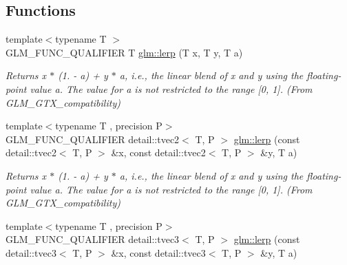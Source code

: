 \subsection*{Functions}
\begin{DoxyCompactItemize}
\item 
{\footnotesize template$<$typename T $>$ }\\G\+L\+M\+\_\+\+F\+U\+N\+C\+\_\+\+Q\+U\+A\+L\+I\+F\+I\+ER T \hyperlink{group__gtx__compatibility_ga5494ba3a95ea6594c86fc75236886864}{glm\+::lerp} (T x, T y, T a)\hypertarget{group__gtx__compatibility_ga5494ba3a95ea6594c86fc75236886864}{}\label{group__gtx__compatibility_ga5494ba3a95ea6594c86fc75236886864}

\begin{DoxyCompactList}\small\item\em Returns x $\ast$ (1. -\/ a) + y $\ast$ a, i.\+e., the linear blend of x and y using the floating-\/point value a. The value for a is not restricted to the range \mbox{[}0, 1\mbox{]}. (From G\+L\+M\+\_\+\+G\+T\+X\+\_\+compatibility) \end{DoxyCompactList}\item 
{\footnotesize template$<$typename T , precision P$>$ }\\G\+L\+M\+\_\+\+F\+U\+N\+C\+\_\+\+Q\+U\+A\+L\+I\+F\+I\+ER detail\+::tvec2$<$ T, P $>$ \hyperlink{group__gtx__compatibility_gad97d71f29fcd1d51a1857a74b67490a0}{glm\+::lerp} (const detail\+::tvec2$<$ T, P $>$ \&x, const detail\+::tvec2$<$ T, P $>$ \&y, T a)\hypertarget{group__gtx__compatibility_gad97d71f29fcd1d51a1857a74b67490a0}{}\label{group__gtx__compatibility_gad97d71f29fcd1d51a1857a74b67490a0}

\begin{DoxyCompactList}\small\item\em Returns x $\ast$ (1. -\/ a) + y $\ast$ a, i.\+e., the linear blend of x and y using the floating-\/point value a. The value for a is not restricted to the range \mbox{[}0, 1\mbox{]}. (From G\+L\+M\+\_\+\+G\+T\+X\+\_\+compatibility) \end{DoxyCompactList}\item 
{\footnotesize template$<$typename T , precision P$>$ }\\G\+L\+M\+\_\+\+F\+U\+N\+C\+\_\+\+Q\+U\+A\+L\+I\+F\+I\+ER detail\+::tvec3$<$ T, P $>$ \hyperlink{group__gtx__compatibility_ga5680b8166d1d6a5fa70cbfb56345a5e6}{glm\+::lerp} (const detail\+::tvec3$<$ T, P $>$ \&x, const detail\+::tvec3$<$ T, P $>$ \&y, T a)\hypertarget{group__gtx__compatibility_ga5680b8166d1d6a5fa70cbfb56345a5e6}{}\label{group__gtx__compatibility_ga5680b8166d1d6a5fa70cbfb56345a5e6}


\end{DoxyCompactItemize}
